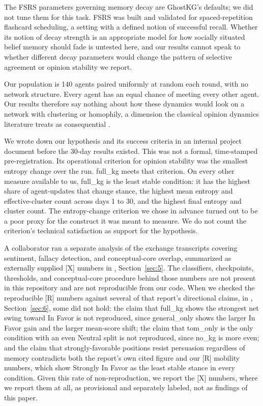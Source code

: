 \documentclass[11pt,a4paper]{article}
\newcommand{\cond}[1]{\textsf{#1}}
\begin{document}
The FSRS parameters governing memory decay are GhostKG's defaults; we did not tune them for this task. FSRS was built and validated for spaced-repetition flashcard scheduling, a setting with a defined notion of successful recall. Whether its notion of decay strength is an appropriate model for how socially situated belief memory should fade is untested here, and our results cannot speak to whether different decay parameters would change the pattern of selective agreement or opinion stability we report.

Our population is 140 agents paired uniformly at random each round, with no network structure. Every agent has an equal chance of meeting every other agent. Our results therefore say nothing about how these dynamics would look on a network with clustering or homophily, a dimension the classical opinion dynamics literature treats as consequential \citep{castellano2009statistical}.

We wrote down our hypothesis and its success criteria in an internal project document before the 30-day results existed. This was not a formal, time-stamped pre-registration. Its operational criterion for opinion stability was the smallest entropy change over the run. \cond{full\_kg} meets that criterion. On every other measure available to us, \cond{full\_kg} is the least stable condition: it has the highest share of agent-updates that change stance, the highest mean entropy and effective-cluster count across days 1 to 30, and the highest final entropy and cluster count. The entropy-change criterion we chose in advance turned out to be a poor proxy for the construct it was meant to measure. We do not count the criterion's technical satisfaction as support for the hypothesis.

A collaborator ran a separate analysis of the exchange transcripts covering sentiment, fallacy detection, and conceptual-core overlap, summarized as externally supplied [X] numbers in , Section~\ref{sec:5}. The classifiers, checkpoints, thresholds, and conceptual-core procedure behind those numbers are not present in this repository and are not reproducible from our code. When we checked the reproducible [R] numbers against several of that report's directional claims, in , Section~\ref{sec:6}, some did not hold: the claim that \cond{full\_kg} shows the strongest net swing toward In Favor is not reproduced, since \cond{general\_only} shows the larger In Favor gain and the larger mean-score shift; the claim that \cond{tom\_only} is the only condition with an even Neutral split is not reproduced, since \cond{no\_kg} is more even; and the claim that strongly-favorable positions resist persuasion regardless of memory contradicts both the report's own cited figure and our [R] mobility numbers, which show Strongly In Favor as the least stable stance in every condition. Given this rate of non-reproduction, we report the [X] numbers, where we report them at all, as provisional and separately labeled, not as findings of this paper.
\end{document}
